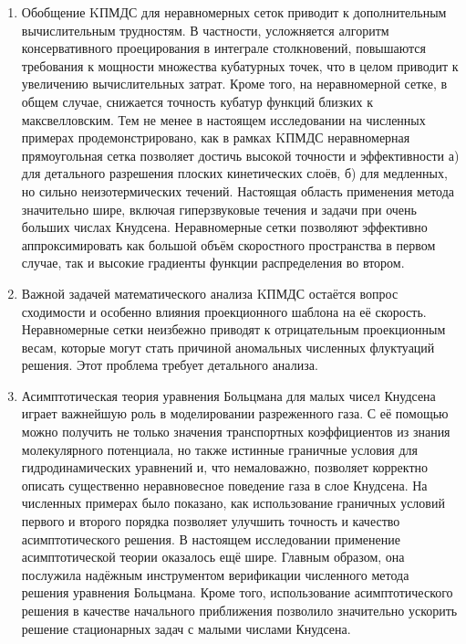 \begin{enumerate}[wide]

\item Обобщение KПМДС для неравномерных сеток приводит к дополнительным вычислительным трудностям.
В частности, усложняется алгоритм консервативного проецирования в интеграле столкновений,
повышаются требования к мощности множества кубатурных точек,
что в целом приводит к увеличению вычислительных затрат.
Кроме того, на неравномерной сетке, в общем случае, снижается точность кубатур функций близких к максвелловским.
Тем не менее в настоящем исследовании на численных примерах продемонстрировано,
как в рамках KПМДС неравномерная прямоугольная сетка позволяет достичь высокой точности и эффективности
а) для детального разрешения плоских кинетических слоёв,
б) для медленных, но сильно неизотермических течений.
Настоящая область применения метода значительно шире, включая
гиперзвуковые течения и задачи при очень больших числах Кнудсена.
Неравномерные сетки позволяют эффективно аппроксимировать
как большой объём скоростного пространства в первом случае,
так и высокие градиенты функции распределения во втором.

\item Важной задачей математического анализа KПМДС остаётся вопрос сходимости
и особенно влияния проекционного шаблона на её скорость.
Неравномерные сетки неизбежно приводят к отрицательным проекционным весам,
которые могут стать причиной аномальных численных флуктуаций решения.
Этот проблема требует детального анализа.

\item Асимптотическая теория уравнения Больцмана для малых чисел Кнудсена
играет важнейшую роль в моделировании разреженного газа.
С её помощью можно получить не только значения транспортных коэффициентов из знания молекулярного потенциала,
но также истинные граничные условия для гидродинамических уравнений и, что немаловажно,
позволяет корректно описать существенно неравновесное поведение газа в слое Кнудсена.
На численных примерах было показано, как использование граничных условий первого и второго порядка
позволяет улучшить точность и качество асимптотического решения.
В настоящем исследовании применение асимптотической теории оказалось ещё шире.
Главным образом, она послужила надёжным инструментом верификации численного метода решения уравнения Больцмана.
Кроме того, использование асимптотического решения в качестве начального приближения позволило
значительно ускорить решение стационарных задач с малыми числами Кнудсена.


\end{enumerate}
